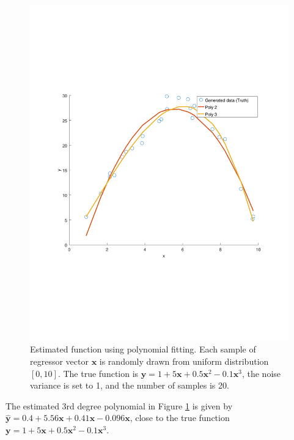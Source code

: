 \documentclass[]{article}
\begin{document}
\begin{figure}[ht]
	\centering
	\includegraphics[trim= 10cm 5cm 10cm 5cm, scale=0.4]{proj1-1d}
	\caption{Estimated function using polynomial fitting. Each sample of regressor vector $\mathbf{x}$ is randomly drawn from uniform distribution $[0,10]$. The true function is $\mathbf{y}=1+5\mathbf{x} + 0.5\mathbf{x}^2 - 0.1\mathbf{x}^3$, the noise variance is set to 1, and the number of samples is 20. }
	\label{fig:poly1d}
\end{figure}

The estimated 3rd degree polynomial in Figure \ref{fig:poly1d} is given by $\hat{\mathbf{y}} = 0.4 + 5.56\mathbf{x} + 0.41\mathbf{x} - 0.096\mathbf{x}$, close to the true function $\mathbf{y}=1+5\mathbf{x} + 0.5\mathbf{x}^2 - 0.1\mathbf{x}^3$.
\end{document}
